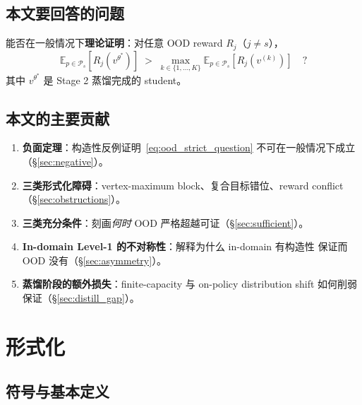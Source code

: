 \documentclass[11pt,a4paper]{article}
\newcommand{\E}{\mathbb{E}}
\theoremstyle{definition}
\begin{document}
\subsection{本文要回答的问题}

\begin{tcolorbox}[colback=red!5,colframe=red!50,title=\textbf{核心问题}]
能否在一般情况下\textbf{理论证明}：对任意 OOD reward $R_j$（$j \neq s$），
\begin{equation}
\boxed{
\E_{p \in \mathcal{P}_s}[R_j(v^{\theta^*})] \;>\; \max_{k \in \{1, \ldots, K\}}
\E_{p \in \mathcal{P}_s}[R_j(v^{(k)})] \quad ?
}
\label{eq:ood_strict_question}
\end{equation}
其中 $v^{\theta^*}$ 是 Stage 2 蒸馏完成的 student。
\end{tcolorbox}

\subsection{本文的主要贡献}

\begin{enumerate}[leftmargin=1.5em]
\item \textbf{负面定理}：构造性反例证明~\eqref{eq:ood_strict_question}
不可在一般情况下成立（\S\ref{sec:negative}）。
\item \textbf{三类形式化障碍}：vertex-maximum block、复合目标错位、reward
conflict（\S\ref{sec:obstructions}）。
\item \textbf{三类充分条件}：刻画\emph{何时} OOD 严格超越可证（\S\ref{sec:sufficient}）。
\item \textbf{In-domain Level-1 的不对称性}：解释为什么 in-domain 有构造性
保证而 OOD 没有（\S\ref{sec:asymmetry}）。
\item \textbf{蒸馏阶段的额外损失}：finite-capacity 与 on-policy
distribution shift 如何削弱保证（\S\ref{sec:distill_gap}）。
\end{enumerate}

\section{形式化}
\label{sec:formalize}

\subsection{符号与基本定义}
\end{document}
